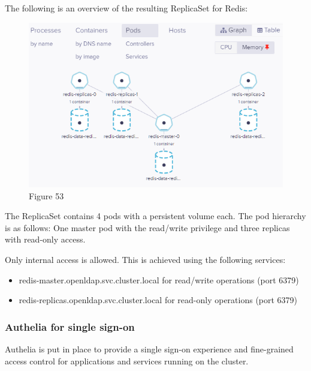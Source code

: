 The following is an overview of the resulting ReplicaSet for Redis: 

\begin{figure}[H]\centering
\includegraphics[width=1.0\textwidth,angle=00]{assets/f53.png}
\caption{Figure 53 }
\label{fig:f53}
\end{figure}

The ReplicaSet contains 4 pods with a persistent volume each. The pod hierarchy is as follows: One master pod with the read/write privilege and three replicas with read-only access.

Only internal access is allowed. This is achieved using the following services: 

\begin{itemize}[label={--}]
\item redis-master.openldap.svc.cluster.local for read/write operations (port 6379) 
\item redis-replicas.openldap.svc.cluster.local for read-only operations (port 6379) 
\end{itemize}

\newpage

\subsubsection{Authelia for single sign-on }

Authelia is put in place to provide a single sign-on experience and fine-grained access control for applications and services running on the cluster.

